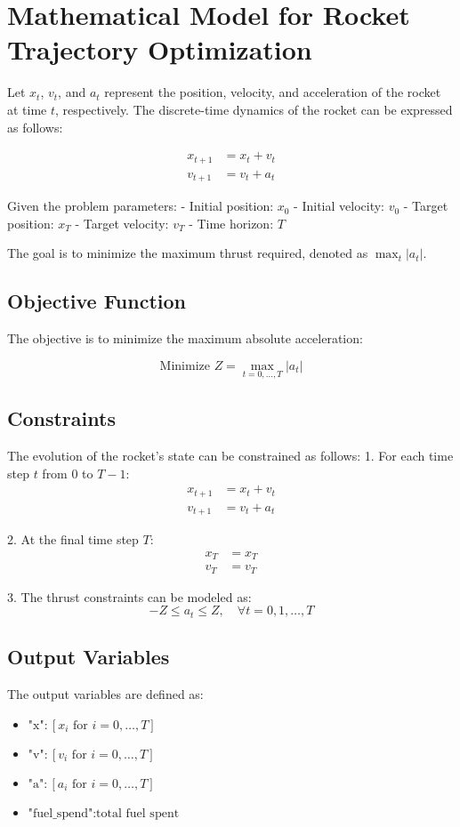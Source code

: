 \documentclass{article}
\begin{document}
\section*{Mathematical Model for Rocket Trajectory Optimization}

Let \( x_t \), \( v_t \), and \( a_t \) represent the position, velocity, and acceleration of the rocket at time \( t \), respectively. The discrete-time dynamics of the rocket can be expressed as follows:

\begin{align}
    x_{t+1} &= x_t + v_t \\
    v_{t+1} &= v_t + a_t
\end{align}

Given the problem parameters:
- Initial position: \( x_0 \)
- Initial velocity: \( v_0 \)
- Target position: \( x_T \)
- Target velocity: \( v_T \)
- Time horizon: \( T \)

The goal is to minimize the maximum thrust required, denoted as \( \max_t |a_t| \).

\subsection*{Objective Function}
The objective is to minimize the maximum absolute acceleration:

\[
\text{Minimize } Z = \max_{t=0, \ldots, T} |a_t|
\]

\subsection*{Constraints}
The evolution of the rocket's state can be constrained as follows:
1. For each time step \( t \) from \( 0 \) to \( T-1 \):
   \begin{align}
       x_{t+1} &= x_t + v_t \\
       v_{t+1} &= v_t + a_t
   \end{align}
   
2. At the final time step \( T \):
   \begin{align}
       x_T &= x_T \\
       v_T &= v_T
   \end{align}

3. The thrust constraints can be modeled as:
   \[
   -Z \leq a_t \leq Z, \quad \forall t = 0, 1, \ldots, T
   \]

\subsection*{Output Variables}
The output variables are defined as:
\begin{itemize}
    \item \( \text{"x"}: [x_i \text{ for } i = 0, \ldots, T] \)
    \item \( \text{"v"}: [v_i \text{ for } i = 0, \ldots, T] \)
    \item \( \text{"a"}: [a_i \text{ for } i = 0, \ldots, T] \)
    \item \( \text{"fuel\_spend"}: \text{total fuel spent} \)
\end{itemize}
\end{document}
